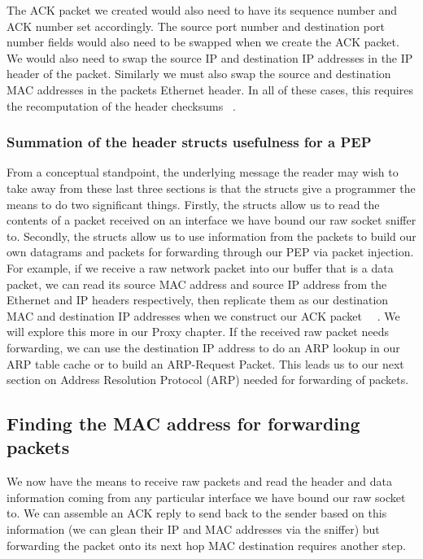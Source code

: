 The ACK packet we created would also need to have its sequence number and ACK number set accordingly. The source port number and destination port number fields would also need to be swapped when we create the ACK packet. We would also need to swap the source IP and destination IP addresses in the IP header of the packet. Similarly we must also swap the source and destination MAC addresses in the packets Ethernet header. In all of these cases, this requires the recomputation of the header checksums ~\cite{38}.\\

\subsubsection{Summation of the header structs usefulness for a PEP}
From a conceptual standpoint, the underlying message the reader may wish to take away from these last three sections is that the structs give a programmer the means to do two significant things. Firstly, the structs allow us to read the contents of a packet received on an interface we have bound our raw socket sniffer to. Secondly, the structs allow us to use information from the packets to build our own datagrams and packets for forwarding through our PEP via packet injection. For example, if we receive a raw network packet into our buffer that is a data packet, we can read its source MAC address and source IP address from the Ethernet and IP headers respectively, then replicate them as our destination MAC and destination IP addresses when we construct our ACK packet ~\cite{35}~\cite{38}. We will explore this more in our Proxy chapter. If the received raw packet needs forwarding, we can use the destination IP address to do an ARP lookup in our ARP table cache or to build an ARP-Request Packet. This leads us to our next section on Address Resolution Protocol (ARP) needed for forwarding of packets. \\

\subsection{Finding the MAC address for forwarding packets}
We now have the means to receive raw packets and read the header and data information coming from any particular interface we have bound our raw socket to. We can assemble an ACK reply to send back to the sender based on this information (we can glean their IP and MAC addresses via the sniffer) but forwarding the packet onto its next hop MAC destination requires another step. \\

